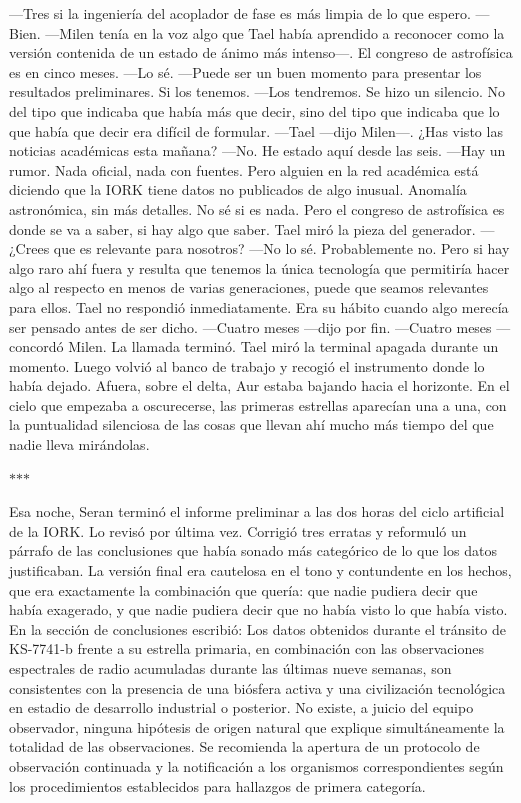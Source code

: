 \documentclass[11pt,a5paper,twoside]{book}
\begin{document}
—Tres si la ingeniería del acoplador de fase es más limpia de lo que espero.
—Bien. —Milen tenía en la voz algo que Tael había aprendido a reconocer como la versión contenida de un estado de ánimo más intenso—. El congreso de astrofísica es en cinco meses.
—Lo sé.
—Puede ser un buen momento para presentar los resultados preliminares. Si los tenemos.
—Los tendremos.
Se hizo un silencio. No del tipo que indicaba que había más que decir, sino del tipo que indicaba que lo que había que decir era difícil de formular.
—Tael —dijo Milen—. ¿Has visto las noticias académicas esta mañana?
—No. He estado aquí desde las seis.
—Hay un rumor. Nada oficial, nada con fuentes. Pero alguien en la red académica está diciendo que la IORK tiene datos no publicados de algo inusual. Anomalía astronómica, sin más detalles. No sé si es nada. Pero el congreso de astrofísica es donde se va a saber, si hay algo que saber.
Tael miró la pieza del generador.
—¿Crees que es relevante para nosotros?
—No lo sé. Probablemente no. Pero si hay algo raro ahí fuera y resulta que tenemos la única tecnología que permitiría hacer algo al respecto en menos de varias generaciones, puede que seamos relevantes para ellos.
Tael no respondió inmediatamente. Era su hábito cuando algo merecía ser pensado antes de ser dicho.
—Cuatro meses —dijo por fin.
—Cuatro meses —concordó Milen.
La llamada terminó. Tael miró la terminal apagada durante un momento. Luego volvió al banco de trabajo y recogió el instrumento donde lo había dejado.
Afuera, sobre el delta, Aur estaba bajando hacia el horizonte. En el cielo que empezaba a oscurecerse, las primeras estrellas aparecían una a una, con la puntualidad silenciosa de las cosas que llevan ahí mucho más tiempo del que nadie lleva mirándolas.
\vspace{1.5em}
\begin{center}$\ast$\quad$\ast$\quad$\ast$\end{center}
\vspace{1.5em}
Esa noche, Seran terminó el informe preliminar a las dos horas del ciclo artificial de la IORK.
Lo revisó por última vez. Corrigió tres erratas y reformuló un párrafo de las conclusiones que había sonado más categórico de lo que los datos justificaban. La versión final era cautelosa en el tono y contundente en los hechos, que era exactamente la combinación que quería: que nadie pudiera decir que había exagerado, y que nadie pudiera decir que no había visto lo que había visto.
En la sección de conclusiones escribió:
Los datos obtenidos durante el tránsito de KS-7741-b frente a su estrella primaria, en combinación con las observaciones espectrales de radio acumuladas durante las últimas nueve semanas, son consistentes con la presencia de una biósfera activa y una civilización tecnológica en estadio de desarrollo industrial o posterior. No existe, a juicio del equipo observador, ninguna hipótesis de origen natural que explique simultáneamente la totalidad de las observaciones. Se recomienda la apertura de un protocolo de observación continuada y la notificación a los organismos correspondientes según los procedimientos establecidos para hallazgos de primera categoría.
\end{document}
